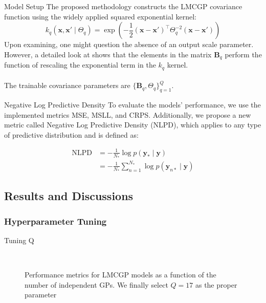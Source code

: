 \begin{frame}{Model Setup}
	The proposed methodology constructs the LMCGP covariance function using the widely applied squared exponential kernel:
	\begin{equation}\label{eq:nonscaled_squared_exponential_kernel}
		k_{q}\left(\mathbf{x}, \mathbf{x'} \mid \Theta_q \right) = \exp\left(-\frac{1}{2}(\mathbf{x} - \mathbf{x'})^\top \Theta_q^{-2} (\mathbf{x} - \mathbf{x'})\right)
	\end{equation}
	Upon examining, one might question the absence of an output scale parameter. However, a detailed look at shows that the elements in the matrix $\mathbf{B}_q$ perform the function of rescaling the exponential term in the $k_q$ kernel.\\~\\ 
	The trainable covariance parameters are $\{ \mathbf{B}_q, \Theta_q\}_{q=1}^Q$.
\end{frame}

\begin{frame}{Negative Log Predictive Density}
	To evaluate the models' performance, we use the implemented metrics MSE, MSLL, and CRPS. Additionally, we propose a new metric called Negative Log Predictive Density (NLPD), which applies to any type of predictive distribution and is defined as:
	
	\begin{equation}
		\begin{split}
			\text{NLPD} &= -\frac{1}{N_*}\log p(\mathbf{y}_* \mid \mathbf{y})\\
			&= -\frac{1}{N_*}\sum_{n=1}^{N_*} \log p(\mathbf{y}_{n*} \mid \mathbf{y}) 
		\end{split}
	\end{equation}
\end{frame}

\subsection{Results and Discussions}

\subsubsection{Hyperparameter Tuning}

\begin{frame}{Tuning Q}
	\begin{figure}[htbp]
	\centering
	\setlength{} 
	\setlength{}
	
	\subfloat[CRPS]{}\hspace{0.1em}
	\subfloat[MSE]{}\\
	\vspace{0.1em} %
	
	\subfloat[MSLL]{}\hspace{0.1em}
	\subfloat[NLPD]{}
	\caption{Performance metrics for LMCGP models as a function of the number of independent GPs. We finally select $Q=17$ as the proper parameter}
	\end{figure}
\end{frame}

